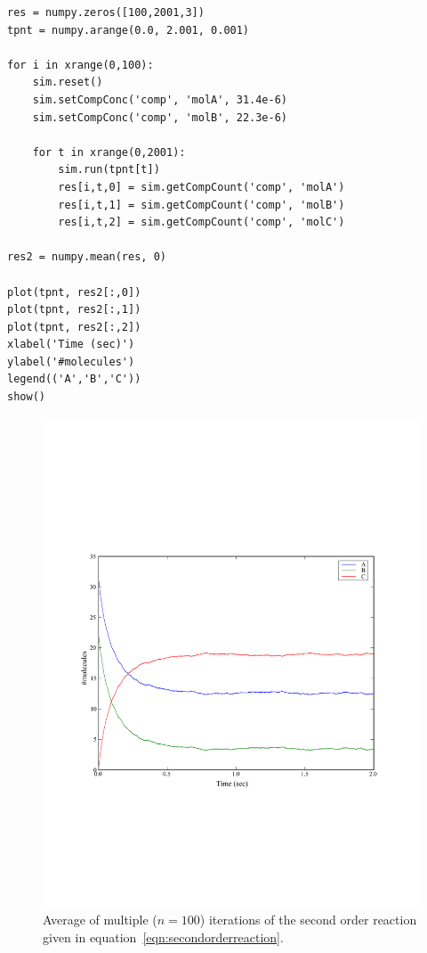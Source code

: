 \documentclass[a4paper,12pt]{book}
\begin{document}
\begin{verbatim}
res = numpy.zeros([100,2001,3])
tpnt = numpy.arange(0.0, 2.001, 0.001)

for i in xrange(0,100):
    sim.reset()
    sim.setCompConc('comp', 'molA', 31.4e-6)
    sim.setCompConc('comp', 'molB', 22.3e-6)
    
    for t in xrange(0,2001):
        sim.run(tpnt[t])
        res[i,t,0] = sim.getCompCount('comp', 'molA')
        res[i,t,1] = sim.getCompCount('comp', 'molB')
        res[i,t,2] = sim.getCompCount('comp', 'molC')

res2 = numpy.mean(res, 0)

plot(tpnt, res2[:,0])
plot(tpnt, res2[:,1])
plot(tpnt, res2[:,2])
xlabel('Time (sec)')
ylabel('#molecules')
legend(('A','B','C'))
show()
\end{verbatim}

\begin{figure}
\centering
\includegraphics[width=13cm]{chap02_secondorderreaction02.pdf}
\caption{Average of multiple ($n=100$) iterations of the second order reaction given in equation~\ref{eqn:secondorderreaction}.}
\label{fig:chap02:secondorderreaction02}
\end{figure}
\end{document}
